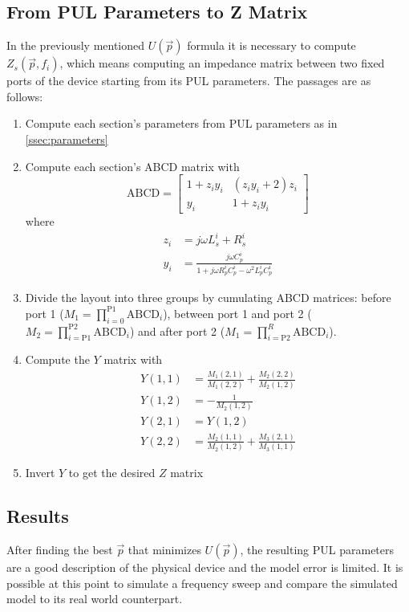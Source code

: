 \subsection{From PUL Parameters to Z Matrix}
\label{ssec:from-parameters-to-Z-matrix}
In the previously mentioned $U(\vec{p})$ formula it is necessary to compute $Z_s\left(\vec{p}, f_i\right)$, which means computing an impedance matrix between two fixed ports of the device starting from its PUL parameters. The passages are as follows:
\begin{enumerate}
    \item Compute each section's parameters from PUL parameters as in \autoref{ssec:parameters}
    \item Compute each section's ABCD matrix with
    \begin{equation*}
        \text{ABCD} = \begin{bmatrix}
            1 + z_i y_i   & (z_i y_i + 2) z_i \\
            y_i           & 1 + z_i y_i
        \end{bmatrix}
    \end{equation*}
    where
    \begin{align*}
        z_i &= j \omega L_s^i + R_s^i \\
        y_i &= \frac{j \omega C_p^i}{1 + j\omega R_p^i C_p^i - \omega^2 L_p^i C_p^i}
    \end{align*}
    \item Divide the layout into three groups by cumulating ABCD matrices: before port 1 ($M_1 = \prod_{i = 0} ^ \text{P1} \text{ABCD}_i$), between port 1 and port 2 ($M_2 = \prod_{i = \text{P1}} ^ \text{P2} \text{ABCD}_i$) and after port 2 ($M_1 = \prod_{i = \text{P2}} ^ R \text{ABCD}_i$).

    \item Compute the $Y$ matrix with
    \begin{align*}
        Y(1, 1) &= \frac{M_1(2, 1)}{M_1(2, 2)} + \frac{M_2(2, 2)}{M_2(1, 2)} \\
        Y(1, 2) &= -\frac{1}{M_2(1, 2)} \\
        Y(2, 1) &= Y(1, 2) \\
        Y(2, 2) &= \frac{M_2(1, 1)}{M_2(1, 2)} + \frac{M_3(2, 1)}{M_3(1, 1)}
    \end{align*}
    \item Invert $Y$ to get the desired $Z$ matrix
\end{enumerate}

\subsection{Results}
After finding the best $\vec{p}$ that minimizes $U(\vec{p})$, the resulting PUL parameters are a good description of the physical device and the model error is limited. It is possible at this point to simulate a frequency sweep and compare the simulated model to its real world counterpart.
